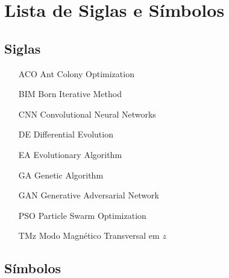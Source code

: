
\newpage
\chapter*{Lista de Siglas e Símbolos} %

	\section*{Siglas}
	
		\begin{itemize}[labelwidth=5em,leftmargin=\dimexpr{}+\relax,align=left]
			\item[ACO] Ant Colony Optimization
			\item[BIM] Born Iterative Method
			\item[CNN] Convolutional Neural Networks
			\item[DE] Differential Evolution
			\item[EA] Evolutionary Algorithm
			\item[GA] Genetic Algorithm
			\item[GAN] Generative Adversarial Network
			\item[PSO] Particle Swarm Optimization
			\item[TMz] Modo Magnético Transversal em $z$
		\end{itemize}
	
		\thispagestyle{empty}

	\section*{Símbolos}
	
		\thispagestyle{empty}
	
